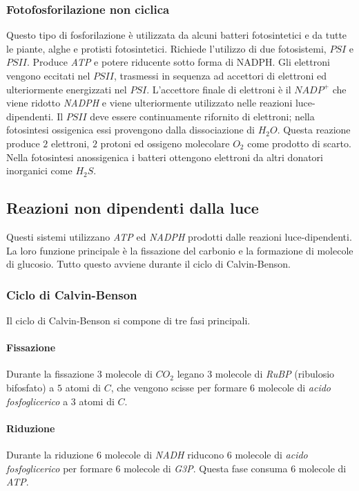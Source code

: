 		\subsubsection{Fotofosforilazione non ciclica}
		Questo tipo di fosforilazione \`e utilizzata da alcuni  batteri fotosintetici e da tutte le piante, alghe e protisti fotosintetici. 
		Richiede l'utilizzo di due fotosistemi, $PSI$ e $PSII$.
		Produce \emph{ATP} e potere riducente sotto forma di NADPH. 
		Gli elettroni vengono eccitati nel $PSII$, trasmessi in sequenza ad accettori di elettroni ed ulteriormente energizzati nel $PSI$. 
		L'accettore finale di elettroni \`e il \emph{$NADP^+$} che viene ridotto \emph{NADPH} e viene ulteriormente utilizzato nelle reazioni luce-dipendenti. 
		Il $PSII$ deve essere continuamente rifornito di elettroni; nella fotosintesi ossigenica essi provengono dalla dissociazione di \emph{$H_2O$}. 
		Questa reazione produce $2$ elettroni, $2$ protoni ed ossigeno molecolare \emph{$O_2$} come prodotto di scarto. 
		Nella fotosintesi anossigenica i batteri ottengono elettroni da altri donatori inorganici come \emph{$H_2S$}.

	\subsection{Reazioni non dipendenti dalla luce}
	Questi sistemi utilizzano \emph{ATP} ed \emph{NADPH} prodotti dalle reazioni luce-dipendenti. 
	La loro funzione principale \`e la fissazione del carbonio e la formazione di molecole di glucosio. 
	Tutto questo avviene durante il ciclo di Calvin-Benson. 

		\subsubsection{Ciclo di Calvin-Benson}
		Il ciclo di Calvin-Benson si compone di tre fasi principali.

			\paragraph{Fissazione}
			Durante la fissazione $3$ molecole di \emph{$CO_2$} legano $3$ molecole di \emph{RuBP} (ribulosio bifosfato) a $5$ atomi di $C$, che vengono scisse per formare $6$ molecole di \emph{acido fosfoglicerico} a $3$ atomi di $C$.

			\paragraph{Riduzione}
			Durante la riduzione $6$ molecole di \emph{NADH} riducono $6$ molecole di \emph{acido fosfoglicerico} per formare $6$ molecole di \emph{G3P}. 
			Questa fase consuma $6$ molecole di \emph{ATP}.

